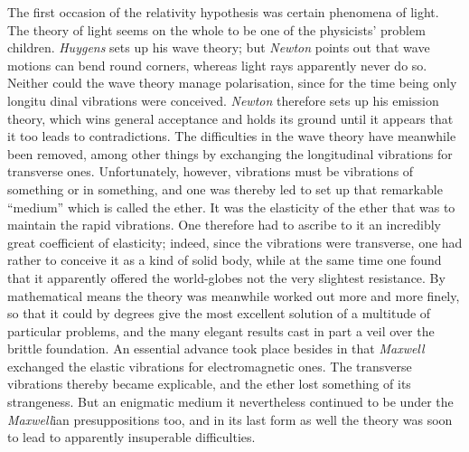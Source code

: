 \documentclass[12pt,a4paper]{article}
\begin{document}
The first occasion of the relativity hypothesis was certain phenomena of
light. The theory of light seems on the whole to be one of the physicists'
problem children. \emph{Huygens} sets up his wave theory; but \emph{Newton}
points out that wave motions can bend round corners, whereas light rays
apparently never do so. Neither could the wave theory manage polarisation,
since for the time being only longitu\-%
dinal vibrations were conceived.
\emph{Newton} therefore sets up his emission theory, which wins general
acceptance and holds its ground until it appears that it too leads to
contradictions. The difficulties in the wave theory have meanwhile been
removed, among other things by exchanging the longitudinal vibrations for
transverse ones. Unfortunately, however, vibrations must be vibrations of
something or in something, and one was thereby led to set up that remarkable
``medium'' which is called the ether. It was the elasticity of the ether that
was to maintain the rapid vibrations. One therefore had to ascribe to it an
incredibly great coefficient of elasticity; indeed, since the vibrations were
transverse, one had rather to conceive it as a kind of solid body, while at
the same time one found that it apparently offered the world-globes not the
very slightest resistance. By mathematical means the theory was meanwhile
worked out more and more finely, so that it could by degrees give the most
excellent solution of a multitude of particular problems, and the many elegant
results cast in part a veil over the brittle foundation. An essential advance
took place besides in that \emph{Maxwell} exchanged the elastic vibrations for
electromagnetic ones. The transverse vibrations thereby became explicable, and
the ether lost something of its strangeness. But an enigmatic medium it
nevertheless continued to be under the \emph{Maxwell}ian presuppositions too,
and in its last form as well the theory was soon to lead to apparently
insuperable difficulties.
\end{document}
